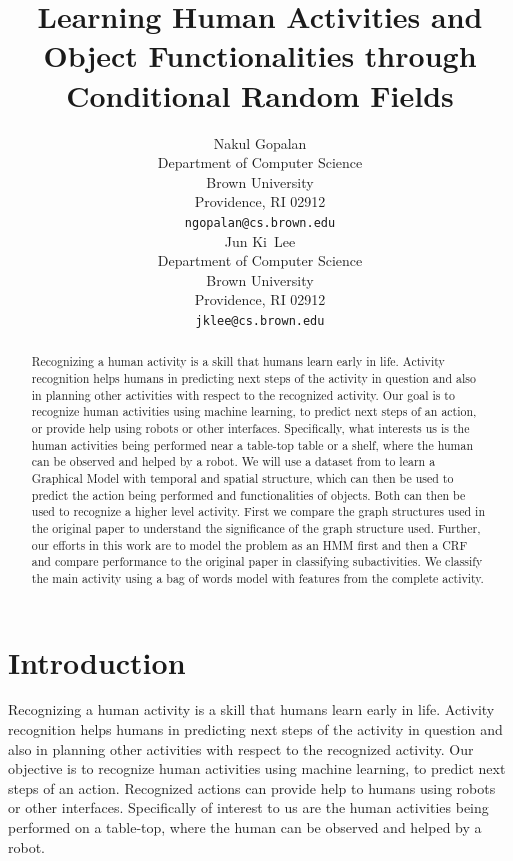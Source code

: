\documentclass{article} %
\title{Learning Human Activities and Object Functionalities through Conditional Random Fields}
\author{
Nakul Gopalan\\
Department of Computer Science\\
Brown University\\
Providence, RI 02912 \\
\texttt{ngopalan@cs.brown.edu} \\
\And
Jun Ki~Lee\\
Department of Computer Science\\
Brown University\\
Providence, RI 02912 \\
\texttt{jklee@cs.brown.edu} \\
}
\begin{document}
\maketitle

\begin{abstract}
Recognizing a human activity is a skill that humans learn early in life. Activity recognition helps humans in predicting next steps of the activity in question and also in planning other activities with respect to the recognized activity. Our goal is to recognize human activities using machine learning, to predict next steps of an action, or provide help using robots or other interfaces. Specifically, what interests us is the human activities being performed near a table-top table or a shelf, where the human can be observed and helped by a robot. We will use a dataset from \cite{koppula2013detectingactivitiesrgbd} to learn a Graphical Model with temporal and spatial structure, which can then be used to predict the action being performed and functionalities of objects. Both can then be used to recognize a higher level activity. First we compare the graph structures used in the original paper to understand the significance of the graph structure used. Further, our efforts in this work are to model the problem as an HMM first and then a CRF and compare performance to the original paper in classifying subactivities. We classify the main activity using a bag of words model with features from the complete activity. 
\end{abstract}

\section{Introduction}
Recognizing a human activity is a skill that humans learn early in life. Activity recognition helps humans in predicting next steps of the activity in question and also in planning other activities with respect to the recognized activity. Our objective is to recognize human activities using machine learning, to predict next steps of an action. Recognized actions can provide help to humans using robots or other interfaces. Specifically of interest to us are the human activities being performed on a table-top, where the human can be observed and helped by a robot.
\end{document}
